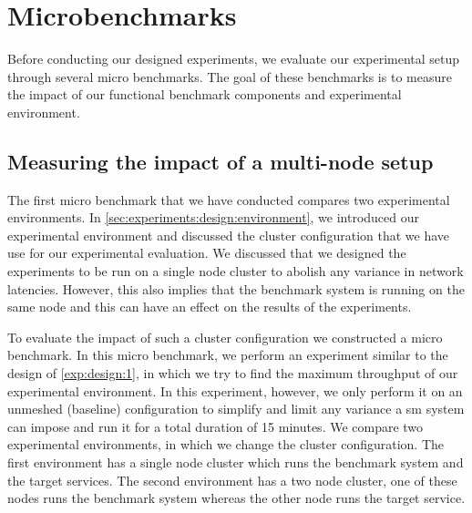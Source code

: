 \section{Microbenchmarks}
\label{sec:experiments:microbenchmarks}

Before conducting our designed experiments, we evaluate our experimental setup through several micro benchmarks. The goal of these benchmarks is to measure the impact of our functional benchmark components and experimental environment.


\subsection{Measuring the impact of a multi-node setup}
\label{sec:experiments:microbenchmarks:node-count}

The first micro benchmark that we have conducted compares two experimental environments. In \cref{sec:experiments:design:environment}, we introduced our experimental environment and discussed the cluster configuration that we have use for our experimental evaluation. We discussed that we designed the experiments to be run on a single node cluster to abolish any variance in network latencies. However, this also implies that the benchmark system is running on the same node and this can have an effect on the results of the experiments.

To evaluate the impact of such a cluster configuration we constructed a micro benchmark. In this micro benchmark, we perform an experiment similar to the design of \ref{exp:design:1}, in which we try to find the maximum throughput of our experimental environment. In this experiment, however, we only perform it on an unmeshed (baseline) configuration to simplify and limit any variance a \gls{sm} system can impose and run it for a total duration of 15 minutes. We compare two experimental environments, in which we change the cluster configuration. The first environment has a single node cluster which runs the benchmark system and the target services. The second environment has a two node cluster, one of these nodes runs the benchmark system whereas the other node runs the target service.


